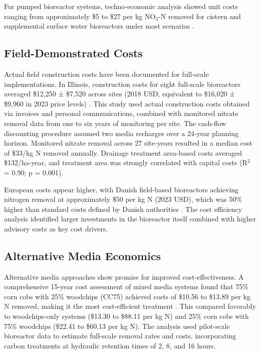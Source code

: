 \documentclass[12pt,a4paper]{article}
\begin{document}
For pumped bioreactor systems, techno-economic analysis showed unit costs ranging from approximately \$5 to \$27 per kg NO$_3$-N removed for cistern and supplemental surface water bioreactors under most scenarios \citep{RN605}.

\subsection{Field-Demonstrated Costs}

Actual field construction costs have been documented for full-scale implementations. In Illinois, construction costs for eight full-scale bioreactors averaged \$12,250 ± \$7,520 across sites (2018 USD, equivalent to \$16,020 ± \$9,960 in 2023 price levels) \citep{RN289}. This study used actual construction costs obtained via invoices and personal communications, combined with monitored nitrate removal data from one to six years of monitoring per site. The cash-flow discounting procedure assumed two media recharges over a 24-year planning horizon. Monitored nitrate removal across 27 site-years resulted in a median cost of \$33/kg N removed annually. Drainage treatment area-based costs averaged \$132/ha-year, and treatment area was strongly correlated with capital costs (R$^2$ = 0.90; p = 0.001).

European costs appear higher, with Danish field-based bioreactors achieving nitrogen removal at approximately \$50 per kg N (2023 USD), which was 50\% higher than standard costs defined by Danish authorities \citep{RN289}. The cost efficiency analysis identified larger investments in the bioreactor itself combined with higher advisory costs as key cost drivers.

\subsection{Alternative Media Economics}

Alternative media approaches show promise for improved cost-effectiveness. A comprehensive 15-year cost assessment of mixed media systems found that 75\% corn cobs with 25\% woodchips (CC75) achieved costs of \$10.56 to \$13.89 per kg N removed, making it the most cost-efficient treatment \citep{RN350}. This compared favorably to woodchips-only systems (\$13.30 to \$88.11 per kg N) and 25\% corn cobs with 75\% woodchips (\$22.41 to \$60.13 per kg N). The analysis used pilot-scale bioreactor data to estimate full-scale removal rates and costs, incorporating carbon treatments at hydraulic retention times of 2, 8, and 16 hours.
\end{document}
